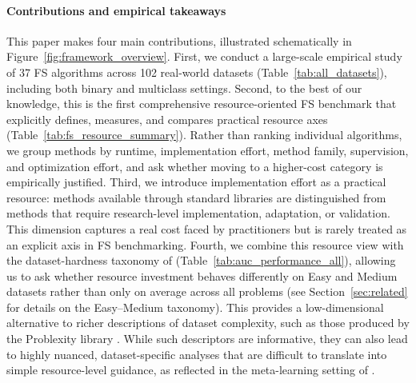 \documentclass[preprint,12pt,authoryear]{elsarticle}
\begin{document}
\paragraph{Contributions and empirical takeaways}
This paper makes four main contributions, illustrated schematically in Figure~\ref{fig:framework_overview}. First, we conduct a large-scale empirical study of 37 FS algorithms across 102 real-world datasets (Table~\ref{tab:all_datasets}), including both binary and multiclass settings. Second, to the best of our knowledge, this is the first comprehensive resource-oriented FS benchmark that explicitly defines, measures, and compares practical resource axes (Table~\ref{tab:fs_resource_summary}). Rather than ranking individual algorithms, we group methods by runtime, implementation effort, method family, supervision, and optimization effort, and ask whether moving to a higher-cost category is empirically justified. Third, we introduce implementation effort as a practical resource: methods available through standard libraries are distinguished from methods that require research-level implementation, adaptation, or validation. This dimension captures a real cost faced by practitioners but is rarely treated as an explicit axis in FS benchmarking. Fourth, we combine this resource view with the dataset-hardness taxonomy of \citep{elmakias2025choosing} (Table~\ref{tab:auc_performance_all}), allowing us to ask whether resource investment behaves differently on Easy and Medium datasets rather than only on average across all problems (see Section~\ref{sec:related} for details on the Easy--Medium taxonomy). This provides a low-dimensional alternative to richer descriptions of dataset complexity, such as those produced by the Problexity library \citep{Komorniczak2023Problexity}. While such descriptors are informative, they can also lead to highly nuanced, dataset-specific analyses that are difficult to translate into simple resource-level guidance, as reflected in the meta-learning setting of \citep{PARMEZAN20171}.
\end{document}
